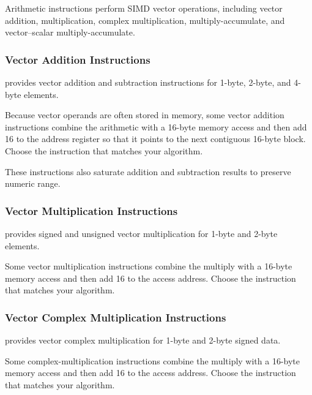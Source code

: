 \documentclass[main\_\_EN.tex]{subfiles}
\begin{document}
Arithmetic instructions perform SIMD vector operations, including vector addition, multiplication, complex multiplication, multiply-accumulate, and vector–scalar multiply-accumulate.

\subsubsection{Vector Addition Instructions}

\chipname{} provides vector addition and subtraction instructions for 1-byte, 2-byte, and 4-byte elements.

Because vector operands are often stored in memory, some vector addition instructions combine the arithmetic with a 16-byte memory access and then add 16 to the address register so that it points to the next contiguous 16-byte block. Choose the instruction that matches your algorithm.

These instructions also saturate addition and subtraction results to preserve numeric range.



\subsubsection{Vector Multiplication Instructions}

\chipname{} provides signed and unsigned vector multiplication for 1-byte and 2-byte elements.

Some vector multiplication instructions combine the multiply with a 16-byte memory access and then add 16 to the access address. Choose the instruction that matches your algorithm.




\subsubsection{Vector Complex Multiplication Instructions}

\chipname{} provides vector complex multiplication for 1-byte and 2-byte signed data.

Some complex-multiplication instructions combine the multiply with a 16-byte memory access and then add 16 to the access address. Choose the instruction that matches your algorithm.


\end{document}

